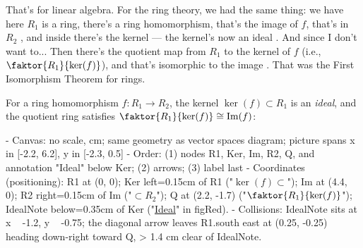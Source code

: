 \begin{speech}[01:10:54 - 01:11:44]
That's for linear algebra. For the ring theory, we had the same thing: we have here $R_1$ is a ring, there's a ring homomorphism, that's the image of $f$, that's in $R_2$ , and inside there's the kernel --- the kernel's now an ideal . And since I don't want to... Then there's the quotient map from $R_1$ to the kernel of $f$ (i.e., $\faktor{R_1}{\ker(f)}$), and that's isomorphic to the image . That was the First Isomorphism Theorem for rings.
\end{speech}

\begin{content}
For a ring homomorphism $f \colon R_1 \to R_2$, the kernel $\ker(f) \subset R_1$ is an \emph{ideal}, and the quotient ring satisfies $\faktor{R_1}{\ker(f)} \cong \operatorname{Im}(f)$:

\begin{hidden}
- Canvas: no scale, cm; same geometry as vector spaces diagram; picture spans x in [-2.2, 6.2], y in [-2.3, 0.5]
- Order: (1) nodes R1, Ker, Im, R2, Q, and annotation "Ideal" below Ker; (2) arrows; (3) label \cong last
- Coordinates (positioning):
  R1 at (0, 0); Ker left=0.15cm of R1 ("$\ker(f) \subset$");
  Im at (4.4, 0); R2 right=0.15cm of Im ("$\subset R_2$");
  Q at (2.2, -1.7) ("$\faktor{R_1}{\ker(f)}$");
  IdealNote below=0.35cm of Ker ("\underline{Ideal}" in figRed).
- Collisions: IdealNote sits at x ~ -1.2, y ~ -0.75; the diagonal arrow leaves R1.south east at (0.25, -0.25) heading down-right toward Q, > 1.4 cm clear of IdealNote.
\end{hidden}
\begin{center}
\end{center}
\end{content}

